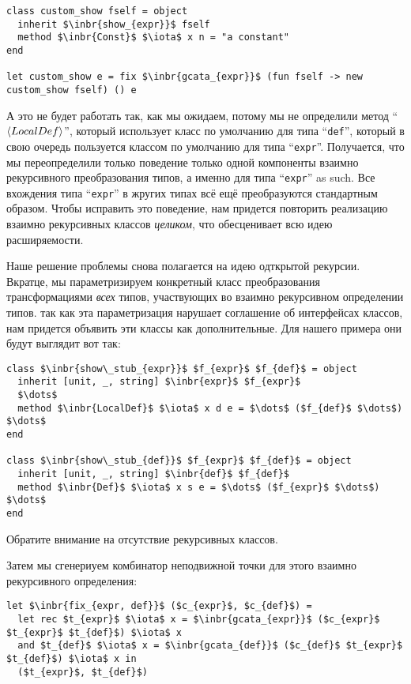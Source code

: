 \begin{lstlisting}
class custom_show fself = object 
  inherit $\inbr{show_{expr}}$ fself
  method $\inbr{Const}$ $\iota$ x n = "a constant"
end

let custom_show e = fix $\inbr{gcata_{expr}}$ (fun fself -> new custom_show fself) () e
\end{lstlisting}

А это не будет работать так, как мы ожидаем, потому мы не определили метод
``$\left<LocalDef\right>$'', который использует класс по умолчанию для типа  ``\lstinline{def}'', который в свою очередь пользуется классом по умолчанию для типа  ``\lstinline{expr}''.
Получается, что мы переопределили только поведение только одной компоненты взаимно рекурсивного преобразования типов, а именно для типа ``\lstinline{expr}'' as such. 
Все вхождения типа ``\lstinline{expr}'' в жругих типах всё ещё преобразуются стандартным образом. Чтобы исправить это поведение, нам придется повторить реализацию взаимно рекурсивных классов \emph{целиком}, что обесценивает всю идею расширяемости.

Наше решение проблемы снова полагается на идею одткрытой рекурсии. Вкратце, мы параметризируем конкретный класс преобразования трансформациями \emph{всех} типов, участвующих во взаимно рекурсивном определении типов.
так как эта параметризация нарушает соглашение об интерфейсах классов, нам придется объявить эти классы как дополнительные. Для нашего примера они будут выглядит вот так:

\begin{lstlisting}
class $\inbr{show\_stub_{expr}}$ $f_{expr}$ $f_{def}$ = object 
  inherit [unit, _, string] $\inbr{expr}$ $f_{expr}$
  $\dots$
  method $\inbr{LocalDef}$ $\iota$ x d e = $\dots$ ($f_{def}$ $\dots$) $\dots$
end

class $\inbr{show\_stub_{def}}$ $f_{expr}$ $f_{def}$ = object 
  inherit [unit, _, string] $\inbr{def}$ $f_{def}$
  method $\inbr{Def}$ $\iota$ x s e = $\dots$ ($f_{expr}$ $\dots$) $\dots$
end
\end{lstlisting}

Обратите внимание на отсутствие рекурсивных классов.


Затем мы сгенериуем комбинатор неподвижной точки для этого взаимно рекурсивного определения:

\begin{lstlisting}
let $\inbr{fix_{expr, def}}$ ($c_{expr}$, $c_{def}$) =
  let rec $t_{expr}$ $\iota$ x = $\inbr{gcata_{expr}}$ ($c_{expr}$ $t_{expr}$ $t_{def}$) $\iota$ x
  and $t_{def}$ $\iota$ x = $\inbr{gcata_{def}}$ ($c_{def}$ $t_{expr}$ $t_{def}$) $\iota$ x in
  ($t_{expr}$, $t_{def}$)
\end{lstlisting}

